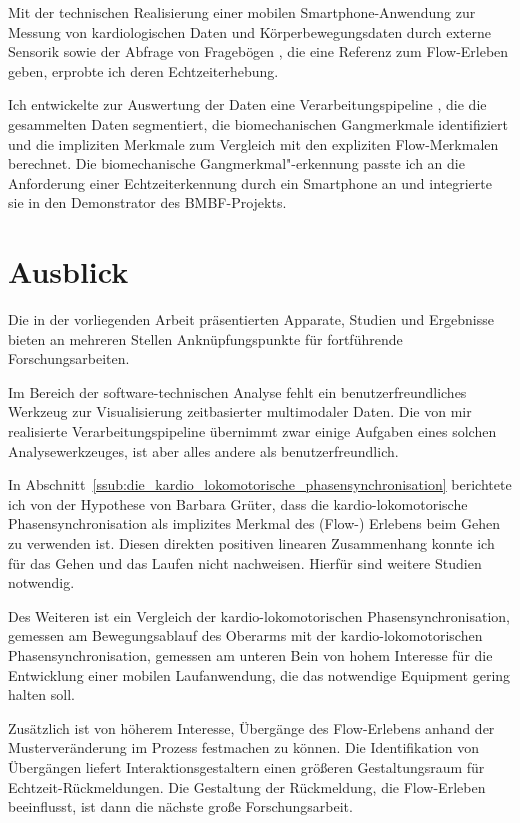 \label{sub:technische_beitrage}

Mit der technischen Realisierung einer mobilen Smartphone-Anwendung zur Messung von kardiologischen Daten und Körperbewegungsdaten durch externe Sensorik sowie der Abfrage von Fragebögen \citep{Bogutzky2016}, die eine Referenz zum Flow-Erleben geben, erprobte ich deren Echtzeiterhebung. 

Ich entwickelte zur Auswertung der Daten eine Verarbeitungspipeline \citep{Bogutzky2016a}, die die gesammelten Daten segmentiert, die biomechanischen Gangmerkmale identifiziert und die impliziten Merkmale zum Vergleich mit den expliziten Flow-Merkmalen berechnet. Die biomechanische Gangmerkmal"-erkennung passte ich an die Anforderung einer Echtzeiterkennung durch ein Smartphone an und integrierte sie in den Demonstrator des \acs{BMBF}-Projekts. 

\section{Ausblick} \label{sec:ausblick} Die in der vorliegenden Arbeit präsentierten Apparate, Studien und Ergebnisse bieten an mehreren Stellen Anknüpfungspunkte für fortführende Forschungsarbeiten.

Im Bereich der software-technischen Analyse fehlt ein benutzerfreundliches Werkzeug zur Visualisierung zeitbasierter multimodaler Daten. Die von mir realisierte Verarbeitungspipeline übernimmt zwar einige Aufgaben eines solchen Analysewerkzeuges, ist aber alles andere als benutzerfreundlich. 

In Abschnitt~\ref{ssub:die_kardio_lokomotorische_phasensynchronisation} berichtete ich von der Hypothese von Barbara Grüter, dass die kardio-lokomotorische Phasensynchronisation als implizites Merkmal des (Flow-) Erlebens beim Gehen zu verwenden ist. Diesen direkten positiven linearen Zusammenhang konnte ich für das Gehen und das Laufen nicht nachweisen. Hierfür sind weitere Studien notwendig.

Des Weiteren ist ein Vergleich der kardio-lokomotorischen Phasensynchronisation, gemessen am Bewegungsablauf des Oberarms mit der kardio-lokomotorischen Phasensynchronisation, gemessen am unteren Bein von hohem Interesse für die Entwicklung einer mobilen Laufanwendung, die das notwendige Equipment gering halten soll.

Zusätzlich ist von höherem Interesse, Übergänge des Flow-Erlebens anhand der Musterveränderung im Prozess festmachen zu können. Die Identifikation von Übergängen liefert Interaktionsgestaltern einen größeren Gestaltungsraum für Echtzeit-Rückmeldungen. Die Gestaltung der Rückmeldung, die Flow-Erleben beeinflusst, ist dann die nächste große Forschungsarbeit.

